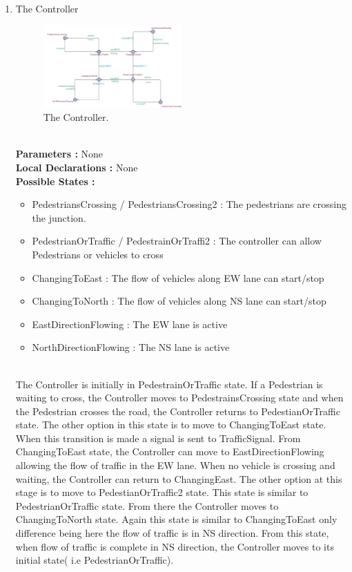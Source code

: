 \documentclass[conference]{IEEEtran}
\begin{document}
\begin{enumerate}
    
    \item The Controller
    \begin{figure}[H]
        \centering
        \includegraphics[width=0.5\textwidth]{Fig 5.png}
    \caption{The Controller.}
    \end{figure}
    \\
    \textbf{Parameters :} None
    \\
    \textbf{Local Declarations :} None
    \\
    \textbf{Possible States :}
    \begin{itemize}
        \item PedestriansCrossing / PedestriansCrossing2 : The pedestrians are crossing the junction.
        \item PedestrianOrTraffic / PedestrainOrTraffi2 : The controller can allow Pedestrians or vehicles to cross
        \item ChangingToEast : The flow of vehicles along EW lane can start/stop
        \item ChangingToNorth : The flow of vehicles along NS lane can start/stop
        \item EastDirectionFlowing : The EW lane is active
        \item NorthDirectionFlowing : The NS lane is active

    \end{itemize}
    \\
    The Controller is initially in PedestrainOrTraffic state. If a Pedestrian is waiting to cross, the Controller moves to PedestrainsCrossing state and when the Pedestrian crosses the road, the Controller returns to PedestianOrTraffic state. The other option in this state is to move to ChangingToEast state. When this transition is made a signal is sent to TrafficSignal. From ChangingToEast state, the Controller can move to EastDirectionFlowing allowing the flow of traffic in the EW lane. When no vehicle is crossing and waiting, the Controller can return to ChangingEast. The other option at this stage is to move to PedestianOrTraffic2 state. This state is similar to PedestrianOrTraffic state. From there the Controller moves to ChangingToNorth state. Again this state is similar to ChangingToEast only difference being here the flow of traffic is in NS direction. From this state, when flow of traffic is complete in NS direction, the Controller moves to its initial state( i.e PedestrianOrTraffic).
    \\
    
\end{enumerate}
\end{document}
